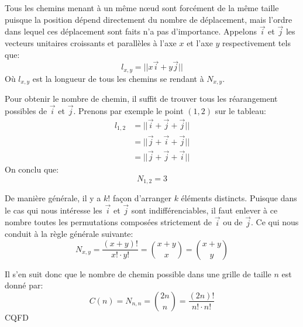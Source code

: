 \documentclass{article}
\begin{document}
Tous les chemins menant à un même n\oe{}ud sont forcément de la même taille puisque la position dépend directement du nombre de déplacement, mais l'ordre dans lequel ces déplacement sont faits n'a pas d'importance. Appelons $\vec{i}$ et $\vec{j}$ les vecteurs unitaires croissants et parallèles à l'axe $x$ et l'axe $y$ respectivement tels que:
$$l_{x,y}= ||x\vec{i} + y\vec{j}||$$
Où $l_{x,y}$ est la longueur de tous les chemins se rendant à $N_{x,y}$.

Pour obtenir le nombre de chemin, il suffit de trouver tous les réarangement possibles de $\vec{i}$ et $\vec{j}$. Prenons par exemple le point $(1, 2)$ sur le tableau:
$$\begin{aligned}
  l_{1, 2} &= ||\vec{i} + \vec{j} + \vec{j}||\\
  &= ||\vec{j} + \vec{i} + \vec{j}||\\
  &= ||\vec{j} + \vec{j} + \vec{i}||
\end{aligned}$$
On conclu que: $$N_{1, 2} = 3$$

De manière générale, il y a $k!$ façon d'arranger $k$ éléments distincts. Puisque dans le cas qui nous intéresse les $\vec{i}$ et $\vec{j}$ sont indifférenciables, il faut enlever à ce nombre toutes les permutations composées strictement de $\vec{i}$ ou de $\vec{j}$. Ce qui nous conduit à la règle générale suivante:
\begin{equation}
  N_{x,y} = \frac{(x + y)!}{x! \cdot{} y!} = \binom{x+y}{x} = \binom{x+y}{y}
\end{equation}

Il s'en suit donc que le nombre de chemin possible dans une grille de taille $n$ est donné par:
\begin{equation}
  C(n) = N_{n, n} = \binom{2n}{n} = \frac{(2n)!}{n! \cdot{} n!}
\end{equation}
CQFD
\end{document}
